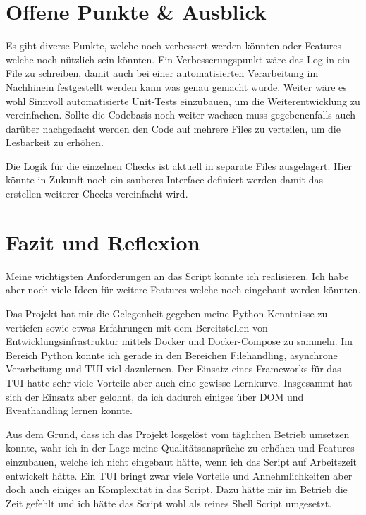 \documentclass[a4paper,oneside, 12pt]{report}
\begin{document}
\section{Offene Punkte \& Ausblick}
Es gibt diverse Punkte, welche noch verbessert werden könnten oder Features welche noch nützlich sein könnten. Ein Verbesserungspunkt wäre das Log in ein File zu schreiben, damit auch bei einer automatisierten Verarbeitung im Nachhinein festgestellt werden kann was genau gemacht wurde. Weiter wäre es wohl Sinnvoll automatisierte Unit-Tests einzubauen, um die Weiterentwicklung zu vereinfachen. Sollte die Codebasis noch weiter wachsen muss gegebenenfalls auch darüber nachgedacht werden den Code auf mehrere Files zu verteilen, um die Lesbarkeit zu erhöhen.

Die Logik für die einzelnen Checks ist aktuell in separate Files ausgelagert. Hier könnte in Zukunft noch ein sauberes Interface definiert werden damit das erstellen weiterer Checks vereinfacht wird.

\section{Fazit und Reflexion}
Meine wichtigsten Anforderungen an das Script konnte ich realisieren. Ich habe aber noch viele Ideen für weitere Features welche noch eingebaut werden könnten.

Das Projekt hat mir die Gelegenheit gegeben meine Python Kenntnisse zu vertiefen sowie etwas Erfahrungen mit dem Bereitstellen von Entwicklungsinfrastruktur mittels Docker und Docker-Compose zu sammeln. Im Bereich Python konnte ich gerade in den Bereichen Filehandling, asynchrone Verarbeitung und \ac{TUI} viel dazulernen. Der Einsatz eines Frameworks für das TUI hatte sehr viele Vorteile aber auch eine gewisse Lernkurve. Insgesammt hat sich der Einsatz aber gelohnt, da ich dadurch einiges über DOM und Eventhandling lernen konnte.

Aus dem Grund, dass ich das Projekt losgelöst vom täglichen Betrieb umsetzen konnte, wahr ich in der Lage meine Qualitätsansprüche zu erhöhen und Features einzubauen, welche ich nicht eingebaut hätte, wenn ich das Script auf Arbeitszeit entwickelt hätte. Ein \ac{TUI} bringt zwar viele Vorteile und Annehmlichkeiten aber doch auch einiges an Komplexität in das Script. Dazu hätte mir im Betrieb die Zeit gefehlt und ich hätte das Script wohl als reines Shell Script umgesetzt.

\end{document}
